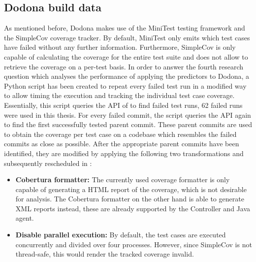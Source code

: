 
\subsection{Dodona build data}
As mentioned before, Dodona makes use of the MiniTest testing framework and the SimpleCov coverage tracker. By default, MiniTest only emits which test cases have failed without any further information. Furthermore, SimpleCov is only capable of calculating the coverage for the entire test suite and does not allow to retrieve the coverage on a per-test basis. In order to answer the fourth research question which analyses the performance of applying the \velocity{} predictors to Dodona, a Python script has been created to repeat every failed test run in a modified way to allow timing the execution and tracking the individual test case coverage. Essentially, this script queries the API of \githubactions{} to find failed test runs, \SI{62}{} failed runs were used in this thesis. For every failed commit, the script queries the API again to find the first successfully tested parent commit. These parent commits are used to obtain the coverage per test case on a codebase which resembles the failed commits as close as possible. After the appropriate parent commits have been identified, they are modified by applying the following two transformations and subsequently rescheduled in \githubactions{}:
\begin{itemize}
	\item \textbf{Cobertura formatter:} The currently used coverage formatter is only capable of generating a HTML report of the coverage, which is not desirable for analysis. The Cobertura formatter on the other hand is able to generate XML reports instead, these are already supported by the Controller and Java agent.
	
	\item \textbf{Disable parallel execution:} By default, the test cases are executed concurrently and divided over four processes. However, since SimpleCov is not thread-safe, this would render the tracked coverage invalid.
\end{itemize}